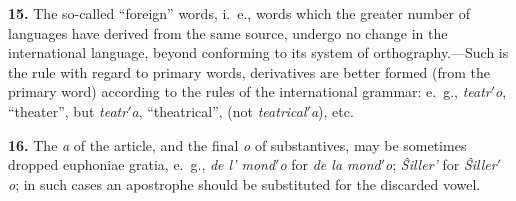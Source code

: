 \textbf{15.} The so-called “foreign” words, i.~e., words which the greater number of languages have derived from the same source, undergo no change in the international language, beyond conforming to its system of orthography.---Such is the rule with regard to primary words, derivatives are better formed (from the primary word) according to the rules of the international grammar: e.~g., \emph{teatr$'$o}, “theater”, but \emph{teatr$'$a}, “theatrical”, (not \emph{teatrical$'$a}), etc.

\textbf{16.} The \emph{a} of the article, and the final \emph{o} of substantives, may be sometimes dropped euphoniae gratia, e.~g., \emph{de l’ mond$'$o} for \emph{de la mond$'$o}; \emph{Ŝiller’} for \emph{Ŝiller$'$o}; in such cases an apostrophe should be substituted for the discarded vowel. 

\newpage